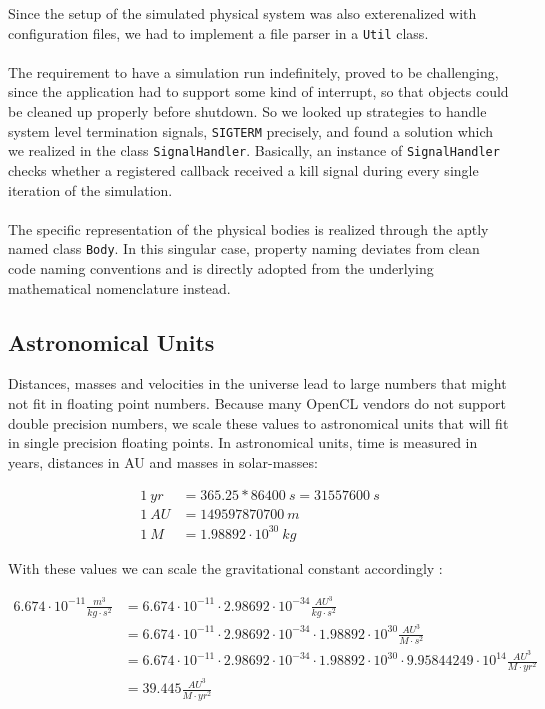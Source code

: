 \documentclass[a4paper,11pt]{scrartcl} %
\begin{document}
Since the setup of the simulated physical system was also exterenalized with configuration files, we had to implement a file parser in a \texttt{Util} class.\\\\
The requirement to have a simulation run indefinitely, proved to be challenging, since the application had to support some kind of interrupt, so that objects could be cleaned up properly before shutdown. So we looked up strategies to handle system level termination signals, \texttt{SIGTERM} precisely, and found a solution which we realized in the class \texttt{SignalHandler}. Basically, an instance of \texttt{SignalHandler} checks whether a registered callback received a kill signal during every single iteration of the simulation.\\\\
The specific representation of the physical bodies is realized through the aptly named class \texttt{Body}. In this singular case, property naming deviates from clean code naming conventions and is directly adopted from the underlying mathematical nomenclature instead.

\subsection{Astronomical Units}
Distances, masses and velocities in the universe lead to large numbers that might not fit in floating point numbers. Because many OpenCL vendors do not support double precision numbers, we scale these values to astronomical units that will fit in single precision floating points. In astronomical units, time is measured in years, distances in AU and masses in solar-masses:

\begin{align*}
	1~yr &= 365.25 * 86400~s = 31557600~s \\
	1~AU &= 149597870700~m \\
	1~M &=  1.98892 \cdot 10^{30}~kg
\end{align*}

With these values we can scale the gravitational constant accordingly \cite{astrounits}:

\begin{align*}
	6.674 \cdot 10^{-11} \frac{m^3}{kg \cdot s^2}
	& =  6.674 \cdot 10^{-11} \cdot 2.98692\cdot 10^{-34} \frac{AU^3}{kg \cdot s^2}\\
	& = 6.674 \cdot 10^{-11} \cdot 2.98692\cdot 10^{-34} \cdot 1.98892 \cdot 10^{30} \frac{AU^3}{M \cdot s^2} \\
	& = 6.674 \cdot 10^{-11} \cdot 2.98692\cdot 10^{-34} \cdot 1.98892 \cdot 10^{30} \cdot 9.95844249\cdot 10^{14} \frac{AU^3}{M \cdot yr^2}\\
	& = 39.445 \frac{AU^3}{M \cdot yr^2}
\end{align*}
\end{document}
